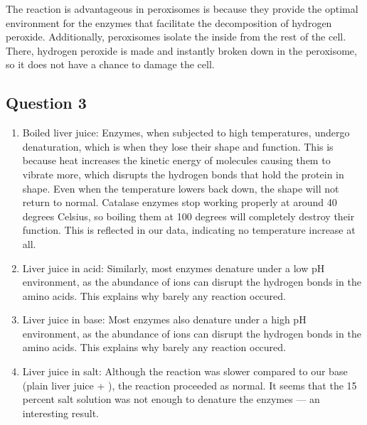 \documentclass[12pt]{article}
\begin{document}
\begin{enumAlph}
    \item The reaction is advantageous in peroxisomes is because they provide
    the optimal environment for the enzymes that 
    facilitate the decomposition of hydrogen peroxide. Additionally, peroxisomes isolate 
    the inside from the rest of the cell. There, hydrogen peroxide is
    made and instantly broken down in the peroxisome, so it does not have a chance to
    damage the cell.

\end{enumAlph}

\subsection*{Question 3}
\begin{enumAlph}
    \item 
    
    \begin{enumerate}[label=\arabic*.]
        \item Boiled liver juice: Enzymes, when subjected to 
        high temperatures, undergo denaturation, which is
        when they lose their shape and function. This is because heat increases the kinetic energy of molecules
        causing them to vibrate more, which disrupts the hydrogen bonds that
        hold the protein in shape. Even when the temperature lowers back down, 
        the shape will not return to normal. Catalase enzymes stop working properly at
        around 40 degrees Celsius, so boiling them at 100 degrees will completely
        destroy their function. This is reflected in our data, indicating no 
        temperature increase at all. 
        
        \item Liver juice in acid: Similarly, most enzymes denature under
        a low pH environment, as the abundance of  ions can disrupt
        the hydrogen bonds in the amino acids. This explains why barely any reaction
        occured. 

        \item Liver juice in base: Most enzymes also denature under
        a high pH environment, as the abundance of  ions can disrupt
        the hydrogen bonds in the amino acids. This explains why barely any reaction
        occured. 

        \item Liver juice in salt: Although the reaction was slower compared to our base (plain liver juice + ), the reaction proceeded 
        as normal. It seems that the 15 percent salt solution was not enough to denature the 
        enzymes --- an interesting result. 


\end{enumerate}
\end{enumAlph}
\end{document}
